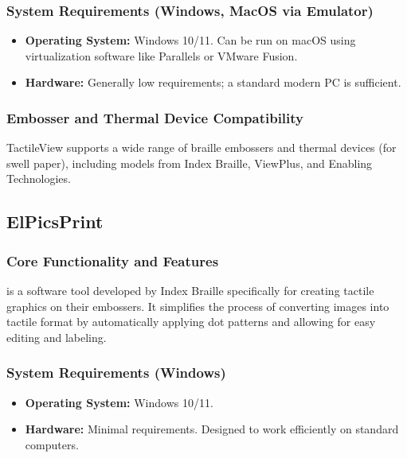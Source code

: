 \subsubsection{System Requirements (Windows, MacOS via Emulator)}\label{ch14:sssec:tactileview-sysreq}
\begin{itemize}
	\item \textbf{Operating System:} Windows 10/11. Can be run on macOS using virtualization software like Parallels or VMware Fusion.
	\item \textbf{Hardware:} Generally low requirements; a standard modern PC is sufficient.
\end{itemize}

\subsubsection{Embosser and Thermal Device Compatibility}\label{ch14:sssec:tactileview-compat}
TactileView supports a wide range of braille embossers and thermal devices (for swell paper), including models from Index Braille, ViewPlus, and Enabling Technologies.

\subsection{ElPicsPrint}\label{ch14:ssec:elpicsprint}
\subsubsection{Core Functionality and Features}\label{ch14:sssec:elpicsprint-features}
 is a software tool developed by Index Braille specifically for creating tactile graphics on their embossers. It simplifies the process of converting images into tactile format by automatically applying dot patterns and allowing for easy editing and labeling.

\subsubsection{System Requirements (Windows)}\label{ch14:sssec:elpicsprint-sysreq}
\begin{itemize}
	\item \textbf{Operating System:} Windows 10/11.
	\item \textbf{Hardware:} Minimal requirements. Designed to work efficiently on standard computers.
\end{itemize}

